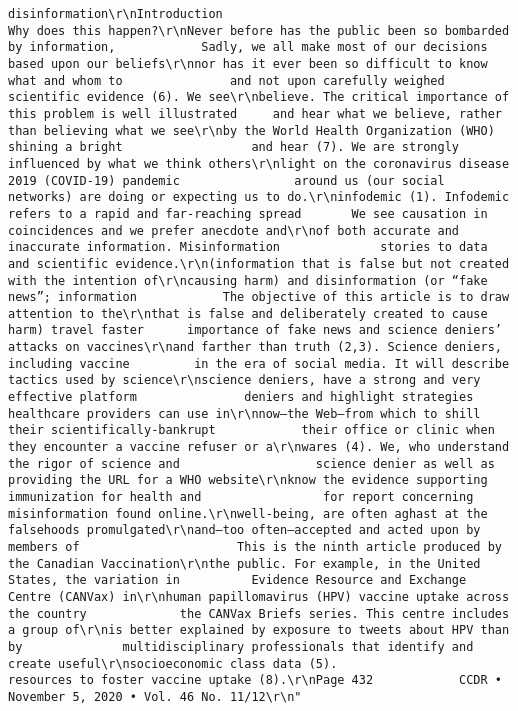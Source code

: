 \documentclass[
]{book}
\begin{document}
\begin{verbatim}
disinformation\r\nIntroduction                                                             Why does this happen?\r\nNever before has the public been so bombarded by information,            Sadly, we all make most of our decisions based upon our beliefs\r\nnor has it ever been so difficult to know what and whom to               and not upon carefully weighed scientific evidence (6). We see\r\nbelieve. The critical importance of this problem is well illustrated     and hear what we believe, rather than believing what we see\r\nby the World Health Organization (WHO) shining a bright                  and hear (7). We are strongly influenced by what we think others\r\nlight on the coronavirus disease 2019 (COVID-19) pandemic                around us (our social networks) are doing or expecting us to do.\r\ninfodemic (1). Infodemic refers to a rapid and far-reaching spread       We see causation in coincidences and we prefer anecdote and\r\nof both accurate and inaccurate information. Misinformation              stories to data and scientific evidence.\r\n(information that is false but not created with the intention of\r\ncausing harm) and disinformation (or “fake news”; information            The objective of this article is to draw attention to the\r\nthat is false and deliberately created to cause harm) travel faster      importance of fake news and science deniers’ attacks on vaccines\r\nand farther than truth (2,3). Science deniers, including vaccine         in the era of social media. It will describe tactics used by science\r\nscience deniers, have a strong and very effective platform               deniers and highlight strategies healthcare providers can use in\r\nnow—the Web—from which to shill their scientifically-bankrupt            their office or clinic when they encounter a vaccine refuser or a\r\nwares (4). We, who understand the rigor of science and                   science denier as well as providing the URL for a WHO website\r\nknow the evidence supporting immunization for health and                 for report concerning misinformation found online.\r\nwell-being, are often aghast at the falsehoods promulgated\r\nand—too often—accepted and acted upon by members of                      This is the ninth article produced by the Canadian Vaccination\r\nthe public. For example, in the United States, the variation in          Evidence Resource and Exchange Centre (CANVax) in\r\nhuman papillomavirus (HPV) vaccine uptake across the country             the CANVax Briefs series. This centre includes a group of\r\nis better explained by exposure to tweets about HPV than by              multidisciplinary professionals that identify and create useful\r\nsocioeconomic class data (5).                                            resources to foster vaccine uptake (8).\r\nPage 432            CCDR • November 5, 2020 • Vol. 46 No. 11/12\r\n"                                                                                                                                                                                                   

\end{verbatim}
\end{document}
